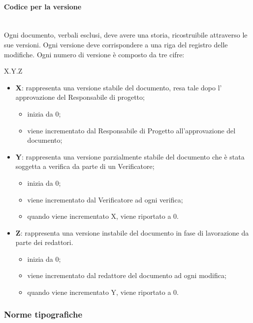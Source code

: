 		\paragraph{Codice per la versione} \mbox{}\\
		Ogni documento, verbali esclusi, deve avere una storia, ricostruibile attraverso le sue versioni. Ogni versione deve corrispondere a una riga del registro delle modifiche. Ogni numero di versione è composto da tre cifre:
		\begin{center}
			X.Y.Z
		\end{center}
		\begin{itemize}
			\item \textbf{X}: rappresenta una versione stabile del documento, resa tale dopo l' approvazione del Responsabile di progetto;
			\begin{itemize}
				\item inizia da 0;
				\item viene incrementato dal Responsabile di Progetto all'approvazione
				del documento;
			\end{itemize}
			\item \textbf{Y}: rappresenta una versione parzialmente stabile del documento che è stata soggetta a verifica da parte di un Verificatore;
			\begin{itemize}
				\item inizia da 0;
				\item viene incrementato dal Verificatore ad ogni verifica;
				\item quando viene incrementato X, viene riportato a 0.
			\end{itemize}
			\item \textbf{Z}: rappresenta una versione instabile del documento in fase di lavorazione da parte dei redattori.
			\begin{itemize}
				\item inizia da 0;
				\item viene incrementato dal redattore del documento ad ogni modifica;
				\item quando viene incrementato Y, viene riportato a 0.
			\end{itemize}			
		\end{itemize}
	\subsubsection{Norme tipografiche}
